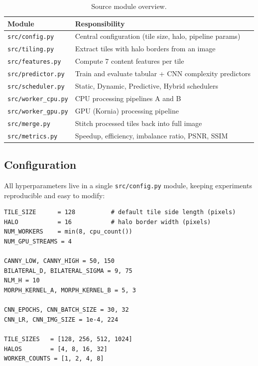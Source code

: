 \documentclass[12pt,a4paper]{article}
\begin{document}
\begin{table}[H]
\centering
\caption{Source module overview.}
\label{tab:modules}
\begin{tabular}{lp{9cm}}
\toprule
\textbf{Module} & \textbf{Responsibility} \\
\midrule
\texttt{src/config.py}      & Central configuration (tile size, halo, pipeline params) \\
\texttt{src/tiling.py}      & Extract tiles with halo borders from an image \\
\texttt{src/features.py}    & Compute 7 content features per tile \\
\texttt{src/predictor.py}   & Train and evaluate tabular + CNN complexity predictors \\
\texttt{src/scheduler.py}   & Static, Dynamic, Predictive, Hybrid schedulers \\
\texttt{src/worker\_cpu.py} & CPU processing pipelines A and B \\
\texttt{src/worker\_gpu.py} & GPU (Kornia) processing pipeline \\
\texttt{src/merge.py}       & Stitch processed tiles back into full image \\
\texttt{src/metrics.py}     & Speedup, efficiency, imbalance ratio, PSNR, SSIM \\
\bottomrule
\end{tabular}
\end{table}

\subsection{Configuration}

All hyperparameters live in a single \texttt{src/config.py} module, keeping experiments reproducible and easy to modify:

\begin{lstlisting}[caption={Central configuration (\texttt{src/config.py}).}, label=lst:config]
TILE_SIZE      = 128          # default tile side length (pixels)
HALO           = 16           # halo border width (pixels)
NUM_WORKERS    = min(8, cpu_count())
NUM_GPU_STREAMS = 4

CANNY_LOW, CANNY_HIGH = 50, 150
BILATERAL_D, BILATERAL_SIGMA = 9, 75
NLM_H = 10
MORPH_KERNEL_A, MORPH_KERNEL_B = 5, 3

CNN_EPOCHS, CNN_BATCH_SIZE = 30, 32
CNN_LR, CNN_IMG_SIZE = 1e-4, 224

TILE_SIZES   = [128, 256, 512, 1024]
HALOS        = [4, 8, 16, 32]
WORKER_COUNTS = [1, 2, 4, 8]
\end{lstlisting}
\end{document}
